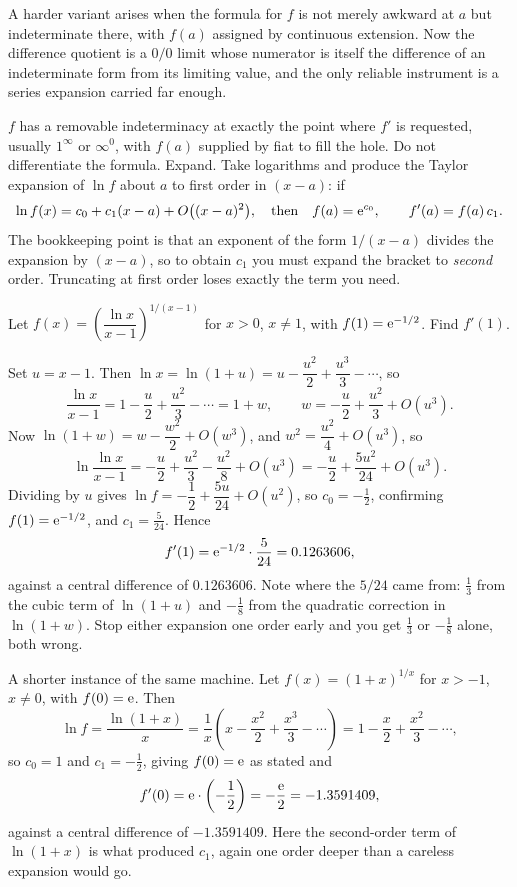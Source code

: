 A harder variant arises when the formula for $f$ is not merely awkward at $a$ but indeterminate there, with $f(a)$ assigned by continuous extension. Now the difference quotient is a $0/0$ limit whose numerator is itself the difference of an indeterminate form from its limiting value, and the only reliable instrument is a series expansion carried far enough.

\cue $f$ has a removable indeterminacy at exactly the point where $f'$ is requested, usually $1^{\infty}$ or $\infty^{0}$, with $f(a)$ supplied by fiat to fill the hole.
\method Do not differentiate the formula. Expand. Take logarithms and produce the Taylor expansion of $\ln f$ about $a$ to first order in $(x-a)$: if
\[
\ln f(x)=c_{0}+c_{1}(x-a)+O\bigl((x-a)^{2}\bigr),\quad\text{then}\quad f(a)=\mathrm{e}^{c_{0}},\qquad f'(a)=f(a)\,c_{1}.
\]
The bookkeeping point is that an exponent of the form $1/(x-a)$ divides the expansion by $(x-a)$, so to obtain $c_{1}$ you must expand the bracket to \emph{second} order. Truncating at first order loses exactly the term you need.

\begin{worked}
Let $f(x)=\left(\dfrac{\ln x}{x-1}\right)^{1/(x-1)}$ for $x>0$, $x\neq1$, with $f(1)=\mathrm{e}^{-1/2}$. Find $f'(1)$.

Set $u=x-1$. Then $\ln x=\ln(1+u)=u-\dfrac{u^{2}}{2}+\dfrac{u^{3}}{3}-\cdots$, so
\[
\frac{\ln x}{x-1}=1-\frac{u}{2}+\frac{u^{2}}{3}-\cdots=1+w,\qquad w=-\frac{u}{2}+\frac{u^{2}}{3}+O(u^{3}).
\]
Now $\ln(1+w)=w-\dfrac{w^{2}}{2}+O(w^{3})$, and $w^{2}=\dfrac{u^{2}}{4}+O(u^{3})$, so
\[
\ln\frac{\ln x}{x-1}=-\frac{u}{2}+\frac{u^{2}}{3}-\frac{u^{2}}{8}+O(u^{3})=-\frac{u}{2}+\frac{5u^{2}}{24}+O(u^{3}).
\]
Dividing by $u$ gives $\ln f=-\dfrac12+\dfrac{5u}{24}+O(u^{2})$, so $c_{0}=-\tfrac12$, confirming $f(1)=\mathrm{e}^{-1/2}$, and $c_{1}=\tfrac{5}{24}$. Hence
\[
f'(1)=\mathrm{e}^{-1/2}\cdot\frac{5}{24}=0.1263606 ,
\]
against a central difference of $0.1263606$. Note where the $5/24$ came from: $\tfrac13$ from the cubic term of $\ln(1+u)$ and $-\tfrac18$ from the quadratic correction in $\ln(1+w)$. Stop either expansion one order early and you get $\tfrac13$ or $-\tfrac18$ alone, both wrong.

A shorter instance of the same machine. Let $f(x)=(1+x)^{1/x}$ for $x>-1$, $x\neq0$, with $f(0)=\mathrm{e}$. Then
\[
\ln f=\frac{\ln(1+x)}{x}=\frac1x\left(x-\frac{x^{2}}{2}+\frac{x^{3}}{3}-\cdots\right)=1-\frac{x}{2}+\frac{x^{2}}{3}-\cdots ,
\]
so $c_{0}=1$ and $c_{1}=-\tfrac12$, giving $f(0)=\mathrm{e}$ as stated and
\[
f'(0)=\mathrm{e}\cdot\left(-\frac12\right)=-\frac{\mathrm{e}}{2}=-1.3591409 ,
\]
against a central difference of $-1.3591409$. Here the second-order term of $\ln(1+x)$ is what produced $c_{1}$, again one order deeper than a careless expansion would go.
\end{worked}

